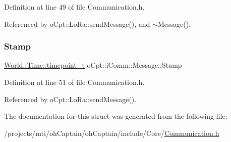 Definition at line 49 of file Communication.\+h.



Referenced by o\+Cpt\+::\+Lo\+Ra\+::send\+Message(), and $\sim$\+Message().

\hypertarget{structo_cpt_1_1i_comm_1_1_message_ad00181a6c0e5cc88b61f808c1638972f}{}\label{structo_cpt_1_1i_comm_1_1_message_ad00181a6c0e5cc88b61f808c1638972f} 
\subsubsection{\texorpdfstring{Stamp}{Stamp}}
{\footnotesize\ttfamily \hyperlink{classo_cpt_1_1_world_1_1_time_a6a6e782c3c90622c1c7070b0a223ec4c}{World\+::\+Time\+::timepoint\+\_\+t} o\+Cpt\+::i\+Comm\+::\+Message\+::\+Stamp}



Definition at line 51 of file Communication.\+h.



Referenced by o\+Cpt\+::\+Lo\+Ra\+::send\+Message().



The documentation for this struct was generated from the following file\+:\begin{DoxyCompactItemize}
\item 
/projects/mti/oh\+Captain/oh\+Captain/include/\+Core/\hyperlink{_communication_8h}{Communication.\+h}\end{DoxyCompactItemize}
